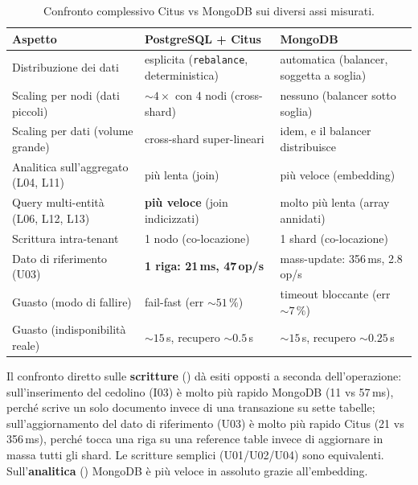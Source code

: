 \begin{table}[htbp]
  \centering
  \caption{Confronto complessivo Citus vs MongoDB sui diversi assi misurati.}
  \label{tab:confronto-completo}
  \begin{tabularx}{\textwidth}{@{}lXX@{}}
    \toprule
    \textbf{Aspetto} & \textbf{PostgreSQL + Citus} & \textbf{MongoDB} \\
    \midrule
    Distribuzione dei dati            & esplicita (\texttt{rebalance}, deterministica) & automatica (balancer, soggetta a soglia) \\
    Scaling per nodi (dati piccoli)   & ${\sim}4\times$ con 4 nodi (cross-shard)       & nessuno (balancer sotto soglia) \\
    Scaling per dati (volume grande)  & cross-shard super-lineari                     & idem, e il balancer distribuisce \\
    Analitica sull'aggregato (L04, L11) & più lenta (join)                           & più veloce (embedding) \\
    Query multi-entità (L06, L12, L13)  & \textbf{più veloce} (join indicizzati)     & molto più lenta (array annidati) \\
    Scrittura intra-tenant            & 1 nodo (co-locazione)                         & 1 shard (co-locazione) \\
    Dato di riferimento (U03)         & \textbf{1 riga: 21\,ms, 47\,op/s}             & mass-update: 356\,ms, 2.8\,op/s \\
    Guasto (modo di fallire)          & fail-fast (err ${\sim}51\,\%$)                & timeout bloccante (err ${\sim}7\,\%$) \\
    Guasto (indisponibilità reale)    & ${\sim}15$\,s, recupero ${\sim}0.5$\,s        & ${\sim}15$\,s, recupero ${\sim}0.25$\,s \\
    \bottomrule
  \end{tabularx}
\end{table}

Il confronto diretto sulle \textbf{scritture} () dà esiti opposti a seconda
dell'operazione: sull'inserimento del cedolino (I03) è molto più rapido MongoDB (11 vs 57\,ms), perché scrive
un solo documento invece di una transazione su sette tabelle; sull'aggiornamento del dato di riferimento (U03)
è molto più rapido Citus (21 vs 356\,ms), perché tocca una riga su una reference table invece di aggiornare in massa tutti gli
shard. Le scritture semplici (U01/U02/U04) sono equivalenti. Sull'\textbf{analitica}
() MongoDB è più veloce in assoluto grazie all'embedding.

